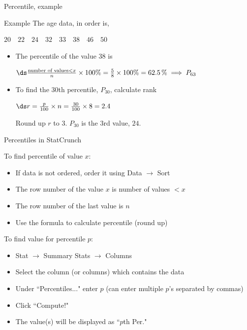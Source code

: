 \documentclass[xcolor=table, handout]{beamer}
\begin{document}
\begin{frame}{Percentile, example}
\begin{exampleblock}{Example}
The age data, in order is, \\
\smallskip
{\centering
$20 \quad 22 \quad 24 \quad 32 \quad 33 \quad 38 \quad 46 \quad 50$
\par}

\begin{itemize}
\pause
\item The percentile of the value 38 is\\
\medskip
{\centering
$\ds \frac{\text{number of values} < x}{n} \times 100\% = \frac{5}{8} \times 100\% = 62.5 \,\% \implies P_{63}$
\par} 
\medskip
\pause\item To find the 30th percentile, $P_{30}$, calculate rank\\
\medskip
{\centering
$\ds r= \frac {p}{100} \times n = \frac {30}{100} \times 8 = 2.4 $
\par}
\medskip
Round up $r$ to $3$. $P_{30}$ is the 3rd value, $24$.
\end{itemize}
\end{exampleblock}
\end{frame}

\begin{frame}{Percentiles in StatCrunch}
\begin{block}{}
To find percentile of value $x$:
\begin{itemize}
\item If data is not ordered, order it using Data $\to$ Sort
\item The row number of the value  $x$ is number of values $< x$
\item The row number of the last value is $n$
\item Use the formula to calculate percentile (round up)
\end{itemize}
To find value for percentile $p$:
\begin{itemize}
\item Stat $\to$ Summary Stats $\to$ Columns
\item Select the column (or columns) which contains the data
\item Under ``Percentiles..." enter $p$ (can enter multiple $p$'s separated by commas)
\item Click ``Compute!"
\item The value(s) will be displayed as ``$p$th Per."
\end{itemize}
\end{block}
\end{frame}
\end{document}
